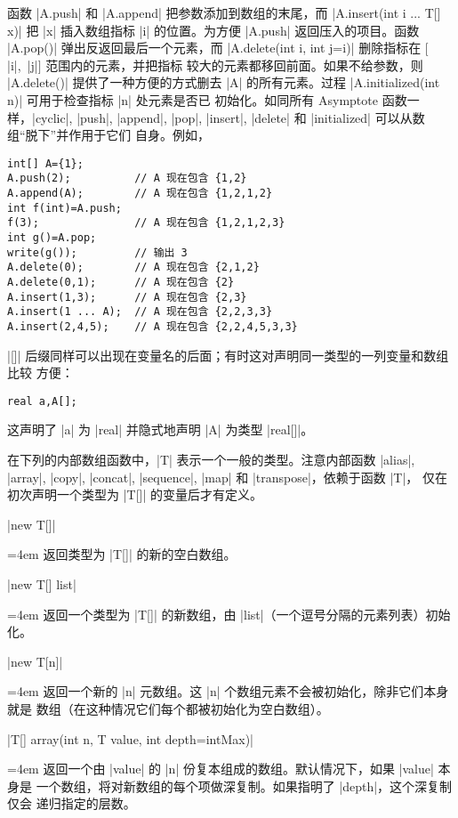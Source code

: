 \documentclass{ctexbook}
\newenvironment{funclist}{\trivlist
  \parindent=0pt
\item[]
  \def\item{\medskip\par\leftskip=0pt}
  \def\go{\par\leftskip=4em}}
{\endtrivlist}
\newcommand*\prgname[1]{\textsf{#1}}
\begin{document}
{{{函数 |A.push| 和 |A.append| 把参数添加到数组的末尾，而
|A.insert(int i ... T[] x)| 把 |x| 插入数组指标 |i| 的位置。为方便 |A.push|
返回压入的项目。函数 |A.pop()| 弹出反返回最后一个元素，而
|A.delete(int i, int j=i)| 删除指标在 $[$|i|,~|j|$]$ 范围内的元素，并把指标
较大的元素都移回前面。如果不给参数，则 |A.delete()| 提供了一种方便的方式删去
|A| 的所有元素。过程 |A.initialized(int n)| 可用于检查指标 |n| 处元素是否已
初始化。如同所有 \prgname{Asymptote} 函数一样，|cyclic|, |push|, |append|,
|pop|, |insert|, |delete| 和 |initialized| 可以从数组“脱下”并作用于它们
自身。例如，
\begin{lstlisting}
int[] A={1};
A.push(2);          // A 现在包含 {1,2}
A.append(A);        // A 现在包含 {1,2,1,2}
int f(int)=A.push;
f(3);               // A 现在包含 {1,2,1,2,3}
int g()=A.pop;
write(g());         // 输出 3
A.delete(0);        // A 现在包含 {2,1,2}
A.delete(0,1);      // A 现在包含 {2}
A.insert(1,3);      // A 现在包含 {2,3}
A.insert(1 ... A);  // A 现在包含 {2,2,3,3}
A.insert(2,4,5);    // A 现在包含 {2,2,4,5,3,3}
\end{lstlisting}

|[]| 后缀同样可以出现在变量名的后面；有时这对声明同一类型的一列变量和数组比较
方便：
\begin{lstlisting}
real a,A[];
\end{lstlisting}
这声明了 |a| 为 |real| 并隐式地声明 |A| 为类型 |real[]|。

在下列的内部数组函数中，|T| 表示一个一般的类型。注意内部函数 |alias|,
|array|, |copy|, |concat|, |sequence|, |map| 和 |transpose|，依赖于函数 |T|，
仅在初次声明一个类型为 |T[]| 的变量后才有定义。

\begin{funclist}
\item |new T[]| \go
  返回类型为 |T[]| 的新的空白数组。

\item |new T[] {list}| \go
  返回一个类型为 |T[]| 的新数组，由 |list|（一个逗号分隔的元素列表）初始化。

\item |new T[n]| \go
  返回一个新的 |n| 元数组。这 |n| 个数组元素不会被初始化，除非它们本身就是
  数组（在这种情况它们每个都被初始化为空白数组）。

\item |T[] array(int n, T value, int depth=intMax)| \go
  返回一个由 |value| 的 |n| 份复本组成的数组。默认情况下，如果 |value| 本身是
  一个数组，将对新数组的每个项做深复制。如果指明了 |depth|，这个深复制仅会
  递归指定的层数。


\end{funclist}}}}
\end{document}
